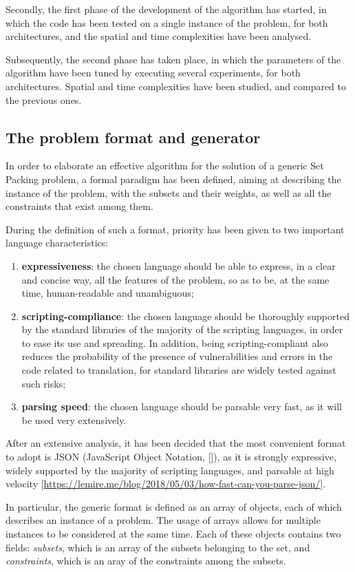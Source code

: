 \documentclass[oneside,a4paper]{article}
\begin{document}
Secondly, the first phase of the development of the algorithm has started, in which the code has been tested on a single instance of the problem, for both architectures, and the spatial and time complexities have been analysed.

Subsequently, the second phase has taken place, in which the parameters of the algorithm have been tuned by executing several experiments, for both architectures. Spatial and time complexities have been studied, and compared to the previous ones. 
\subsection{The problem format and generator}
In order to elaborate an effective algorithm for the solution of a generic Set Packing problem, a formal paradigm has been defined, aiming at describing the instance of the problem, with the subsets and their weights, as well as all the constraints that exist among them.

During the definition of such a format, priority has been given to two important language characteristics:
\begin{enumerate}
    \item \textbf{expressiveness}: the chosen language should be able to express, in a clear and concise way, all the features of the problem, so as to be, at the same time, human-readable and unambiguous;
    \item \textbf{scripting-compliance}: the chosen language should be thoroughly supported by the standard libraries of the majority of the scripting languages, in order to ease its use and spreading. In addition, being scripting-compliant also reduces the probability of the presence of vulnerabilities and errors in the code related to translation, for standard libraries are widely tested against such risks;
    \item \textbf{parsing speed}: the chosen language should be parsable very fast, as it will be used very extensively.
\end{enumerate}
After an extensive analysis, it has been decided that the most convenient format to adopt is JSON (JavaScript Object Notation, []), as it is strongly expressive, widely supported by the majority of scripting languages, and parsable at high velocity [\url{https://lemire.me/blog/2018/05/03/how-fast-can-you-parse-json/}].

In particular, the generic format is defined as an array of objects, each of which describes an instance of a problem. The usage of arrays allows for multiple instances to be considered at the same time. Each of these objects contains two fields: \textit{subsets}, which is an array of the subsets belonging to the set, and \textit{constraints}, which is an aray of the constraints among the subsets. 
\end{document}
